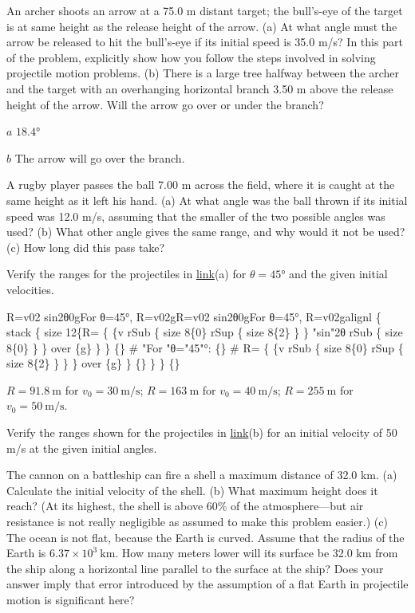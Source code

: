 \documentclass[
]{book}
\newenvironment{problems-exercises}{}{}
\begin{document}
\begin{problems-exercises}
\hypertarget{fs-id1420192}{}
\leavevmode\hypertarget{fs-id1078714}{}%
An archer shoots an arrow at a 75.0 m distant target; the bull's-eye of
the target is at same height as the release height of the arrow. (a) At
what angle must the arrow be released to hit the bull's-eye if its
initial speed is 35.0 m/s? In this part of the problem, explicitly show
how you follow the steps involved in solving projectile motion problems.
(b) There is a large tree halfway between the archer and the target with
an overhanging horizontal branch 3.50 m above the release height of the
arrow. Will the arrow go over or under the branch?

\leavevmode\hypertarget{fs-id1970452}{}%
\(a\) \({\text{18}\text{.}\text{4°}}{}\)

\(b\) The arrow will go over the branch.

\hypertarget{fs-id1934878}{}
\leavevmode\hypertarget{fs-id2226553}{}%
A rugby player passes the ball 7.00 m across the field, where it is
caught at the same height as it left his hand. (a) At what angle was the
ball thrown if its initial speed was 12.0 m/s, assuming that the smaller
of the two possible angles was used? (b) What other angle gives the same
range, and why would it not be used? (c) How long did this pass take?

\hypertarget{fs-id2126267}{}
\leavevmode\hypertarget{fs-id2889922}{}%
Verify the ranges for the projectiles in
\protect\hyperlink{import-auto-id1904800}{link}(a) for
\({\theta = \text{45°}}{}\) and the given initial velocities.

\leavevmode\hypertarget{fs-id1903883}{}%
{R=v02 sin2θ0gFor θ=45°, R=v02gR=v02 sin2θ0gFor θ=45°, R=v02galignl \{
stack \{ size 12\{R= \{ \{v rSub \{ size 8\{0\} rSup \{ size 8\{2\} \} \} "sin"2θ
rSub \{ size 8\{0\} \} \} over \{g\} \} \} \{\} \# "For "θ="45"°: \{\} \# R= \{ \{v
rSub \{ size 8\{0\} rSup \{ size 8\{2\} \} \} \} over \{g\} \} \{\} \} \} \{\}}

\({R = 91.8\ \text{m}}{}\) for \({v_{0} = 30\ \text{m/s}}{}\);
\({R = 163\ \text{m}}{}\) for \({v_{0} = 40\ \text{m/s}}{}\);
\({R = 255\ \text{m}}{}\) for \({v_{0} = 50\ \text{m/s}}{}\).

\hypertarget{fs-id2214647}{}
\leavevmode\hypertarget{fs-id2214182}{}%
Verify the ranges shown for the projectiles in
\protect\hyperlink{import-auto-id1904800}{link}(b) for an initial
velocity of 50 m/s at the given initial angles.

\hypertarget{fs-id2905201}{}
\leavevmode\hypertarget{fs-id1851487}{}%
The cannon on a battleship can fire a shell a maximum distance of 32.0
km. (a) Calculate the initial velocity of the shell. (b) What maximum
height does it reach? (At its highest, the shell is above 60\% of the
atmosphere---but air resistance is not really negligible as assumed to
make this problem easier.) (c) The ocean is not flat, because the Earth
is curved. Assume that the radius of the Earth is
\({6\text{.}{\text{37} \times \text{10}^{3}}\ \text{km}}{}\). How many
meters lower will its surface be 32.0 km from the ship along a
horizontal line parallel to the surface at the ship? Does your answer
imply that error introduced by the assumption of a flat Earth in
projectile motion is significant here?


\end{problems-exercises}
\end{document}
